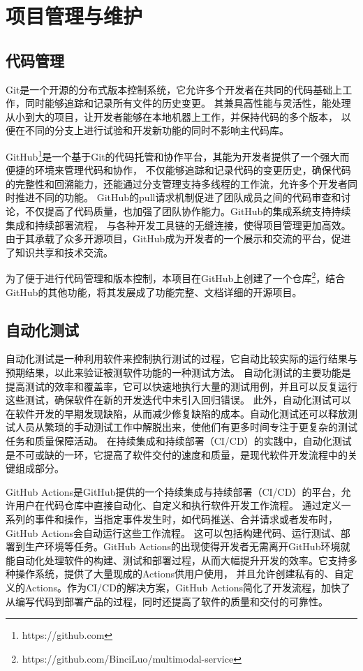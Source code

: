 \documentclass[a4paper,AutoFakeBold,oneside,12pt]{book}
\begin{document}
\chapter{项目管理与维护} %
\section{代码管理}
Git是一个开源的分布式版本控制系统，它允许多个开发者在共同的代码基础上工作，同时能够追踪和记录所有文件的历史变更。
其兼具高性能与灵活性，能处理从小到大的项目，让开发者能够在本地机器上工作，并保持代码的多个版本，
以便在不同的分支上进行试验和开发新功能的同时不影响主代码库。

GitHub\footnote{https://github.com}是一个基于Git的代码托管和协作平台，其能为开发者提供了一个强大而便捷的环境来管理代码和协作，
不仅能够追踪和记录代码的变更历史，确保代码的完整性和回溯能力，还能通过分支管理支持多线程的工作流，允许多个开发者同时推进不同的功能。
GitHub的pull请求机制促进了团队成员之间的代码审查和讨论，不仅提高了代码质量，也加强了团队协作能力。GitHub的集成系统支持持续集成和持续部署流程，
与各种开发工具链的无缝连接，使得项目管理更加高效。由于其承载了众多开源项目，GitHub成为开发者的一个展示和交流的平台，促进了知识共享和技术交流。

为了便于进行代码管理和版本控制，本项目在GitHub上创建了一个仓库\footnote{https://github.com/BinciLuo/multimodal-service}，结合GitHub的其他功能，将其发展成了功能完整、文档详细的开源项目。


\section{自动化测试}
自动化测试是一种利用软件来控制执行测试的过程，它自动比较实际的运行结果与预期结果，以此来验证被测软件功能的一种测试方法。
自动化测试的主要功能是提高测试的效率和覆盖率，它可以快速地执行大量的测试用例，并且可以反复运行这些测试，确保软件在新的开发迭代中未引入回归错误。
此外，自动化测试可以在软件开发的早期发现缺陷，从而减少修复缺陷的成本。自动化测试还可以释放测试人员从繁琐的手动测试工作中解脱出来，使他们有更多时间专注于更复杂的测试任务和质量保障活动。
在持续集成和持续部署（CI/CD）的实践中，自动化测试是不可或缺的一环，它提高了软件交付的速度和质量，是现代软件开发流程中的关键组成部分。

GitHub Actions是GitHub提供的一个持续集成与持续部署（CI/CD）的平台，允许用户在代码仓库中直接自动化、自定义和执行软件开发工作流程。
通过定义一系列的事件和操作，当指定事件发生时，如代码推送、合并请求或者发布时，GitHub Actions会自动运行这些工作流程。
这可以包括构建代码、运行测试、部署到生产环境等任务。GitHub Actions的出现使得开发者无需离开GitHub环境就能自动化处理软件的构建、测试和部署过程，从而大幅提升开发的效率。它支持多种操作系统，提供了大量现成的Actions供用户使用，
并且允许创建私有的、自定义的Actions。作为CI/CD的解决方案，GitHub Actions简化了开发流程，加快了从编写代码到部署产品的过程，同时还提高了软件的质量和交付的可靠性。
\end{document}
